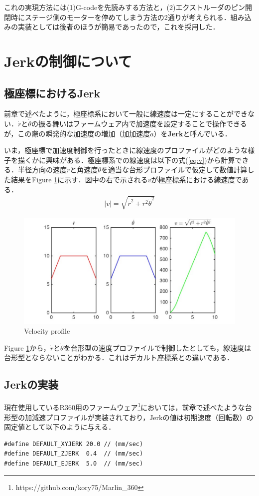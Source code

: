\documentclass[twocolumn,oneside,a4paper]{article}
\begin{document}
これの実現方法には(1)G-codeを先読みする方法と，(2)エクストルーダのピン開閉時にステージ側のモーターを停めてしまう方法の2通りが考えられる．組み込みの実装としては後者のほうが簡易であったので，これを採用した．

\section{Jerkの制御について}
\subsection{極座標におけるJerk}
前章で述べたように，極座標系において一般に線速度は一定にすることができない．$\dot{r}$と$\dot{\theta}$の振る舞いはファームウェア内で加速度を設定することで操作できるが，この際の瞬発的な加速度の増加（加加速度$\dot{a}$）を{\bf Jerk}と呼んでいる．

いま，極座標で加速度制御を行ったときに線速度のプロファイルがどのような様子を描くかに興味がある．極座標系での線速度は以下の式(\ref{eq:v})から計算できる．半径方向の速度$\dot{r}$と角速度$\dot{\theta}$を適当な台形プロファイルで仮定して数値計算した結果をFigure \ref{fig:jerk}に示す．図中の右で示される$v$が極座標系における線速度である．
\begin{eqnarray}\label{eq:v}
     |v| = \sqrt{ \dot{r}^2+ r^2 \dot{\theta}^2 }
\end{eqnarray}

\begin{figure}[htbp]
    \includegraphics[bb=0 0 432 216,width=1\columnwidth]{accel2.pdf}
    \caption{Velocity profile}
    \label{fig:jerk}
\end{figure}

Figure \ref{fig:jerk}から，$\dot{r}$と$\dot{\theta}$を台形型の速度プロファイルで制御したとしても，線速度は台形型とならないことがわかる．これはデカルト座標系との違いである．

\subsection{Jerkの実装}
現在使用しているR360用のファームウェア\footnote{https://github.com/kory75/Marlin\_360}においては，前章で述べたような台形型の加減速プロファイルが実装されており，Jerkの値は初期速度（回転数）の固定値として以下のように与える．
{\small
\begin{verbatim}
#define DEFAULT_XYJERK 20.0 // (mm/sec)
#define DEFAULT_ZJERK  0.4  // (mm/sec)
#define DEFAULT_EJERK  5.0  // (mm/sec)
\end{verbatim}}
\end{document}
